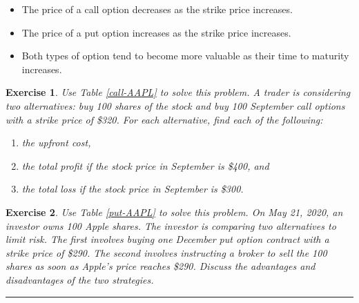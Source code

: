 \documentclass[letterpaper,10pt]{article}
\newtheorem{df}{Definition}[section]
\newtheorem{ex}{Exercise}
\begin{document}
\begin{itemize}

\item The price of a call option decreases as the strike price increases.

\item The price of a put option increases as the strike price increases. 

\item Both types of option tend to become more valuable as their time to maturity increases. 

\end{itemize}

\begin{ex}
Use Table \ref{call-AAPL} to solve this problem.  A trader is considering two alternatives: buy 100 shares of the stock and buy 100 September call options with a strike price of \$320.  For each alternative, find each of the following:
\begin{enumerate}
\item[(a)] the upfront cost,
\item[(b)] the total profit if the stock price in September is \$400, and 
\item[(c)] the total loss if the stock price in September is \$300. 
\end{enumerate}
\end{ex}

\begin{ex}
Use Table \ref{put-AAPL} to solve this problem.  On May 21, 2020, an investor owns 100 Apple shares.  The investor is comparing two alternatives to limit risk. The first involves buying one December put option contract with a strike price of \$290. The second involves instructing a broker to sell the 100 shares as soon as Apple’s price reaches \$290. Discuss the advantages and disadvantages of the two strategies.
\end{ex}

%
%
%
%

\bigskip

\hrule
\end{document}
